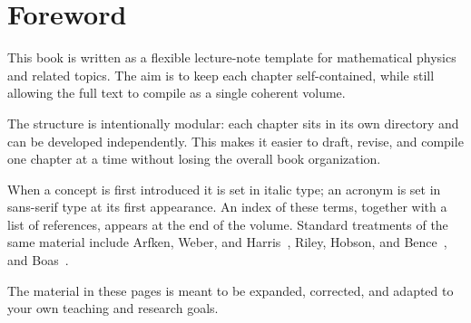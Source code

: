 \chapter*{Foreword}

This book is written as a flexible lecture-note template for mathematical physics and related topics. The aim is to keep each chapter self-contained, while still allowing the full text to compile as a single coherent volume.

The structure is intentionally modular: each chapter sits in its own directory and can be developed independently. This makes it easier to draft, revise, and compile one chapter at a time without losing the overall book organization.

When a concept is first introduced it is set in italic type; an acronym is set in sans-serif type at its first appearance. An index of these terms, together with a list of references, appears at the end of the volume. Standard treatments of the same material include Arfken, Weber, and Harris~\cite{arfken}, Riley, Hobson, and Bence~\cite{riley}, and Boas~\cite{boas}.

The material in these pages is meant to be expanded, corrected, and adapted to your own teaching and research goals.
